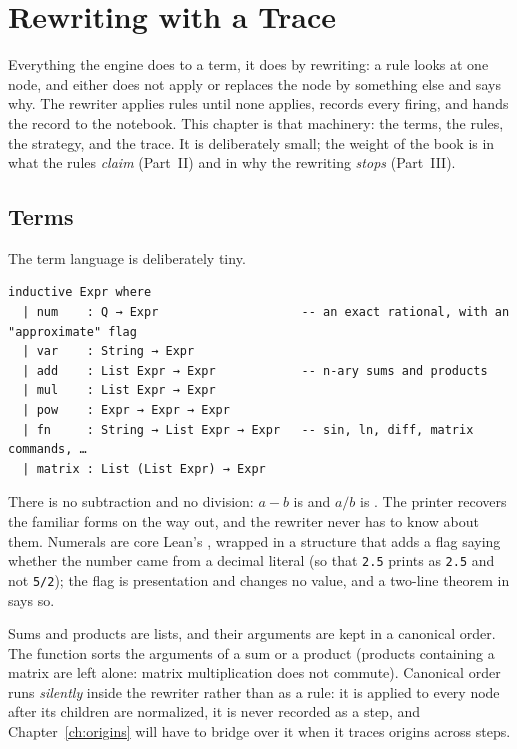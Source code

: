 \chapter{Rewriting with a Trace}\label{ch:rewrite}

Everything the engine does to a term, it does by rewriting: a rule looks at one node, and either
does not apply or replaces the node by something else and says why. The rewriter applies rules
until none applies, records every firing, and hands the record to the notebook. This chapter is
that machinery: the terms, the rules, the strategy, and the trace. It is deliberately small; the
weight of the book is in what the rules \emph{claim} (Part~II) and in why the rewriting
\emph{stops} (Part~III).

\section{Terms}

The term language is deliberately tiny.

\begin{verbatim}
inductive Expr where
  | num    : Q → Expr                    -- an exact rational, with an "approximate" flag
  | var    : String → Expr
  | add    : List Expr → Expr            -- n-ary sums and products
  | mul    : List Expr → Expr
  | pow    : Expr → Expr → Expr
  | fn     : String → List Expr → Expr   -- sin, ln, diff, matrix commands, …
  | matrix : List (List Expr) → Expr
\end{verbatim}

There is no subtraction and no division: $a - b$ is  and $a/b$ is
. The printer recovers the familiar forms on the way out, and the
rewriter never has to know about them. Numerals are core Lean's , wrapped in a structure
 that adds a flag saying whether the number came from a decimal literal (so that
\texttt{2.5} prints as \texttt{2.5} and not \texttt{5/2}); the flag is presentation and changes no
value, and a two-line theorem in  says so.

Sums and products are lists, and their arguments are kept in a canonical order. The function
 sorts the arguments of a sum or a product (products containing a matrix are left
alone: matrix multiplication does not commute). Canonical order runs \emph{silently} inside the
rewriter rather than as a rule: it is applied to every node after its children are normalized,
it is never recorded as a step, and Chapter~\ref{ch:origins} will have to bridge over it when it
traces origins across steps.

